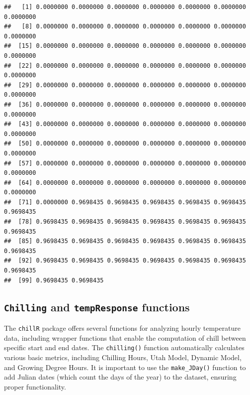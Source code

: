 \documentclass[
]{article}
\newenvironment{Shaded}{\begin{snugshade}}{\end{snugshade}}
\newcommand{\DecValTok}[1]{\textcolor[rgb]{0.00,0.00,0.81}{#1}}
\newcommand{\FunctionTok}[1]{\textcolor[rgb]{0.13,0.29,0.53}{\textbf{#1}}}
\newcommand{\NormalTok}[1]{#1}
\newcommand{\SpecialCharTok}[1]{\textcolor[rgb]{0.81,0.36,0.00}{\textbf{#1}}}
\begin{document}
\begin{Shaded}
\end{Shaded}

\begin{verbatim}
##   [1] 0.0000000 0.0000000 0.0000000 0.0000000 0.0000000 0.0000000 0.0000000
##   [8] 0.0000000 0.0000000 0.0000000 0.0000000 0.0000000 0.0000000 0.0000000
##  [15] 0.0000000 0.0000000 0.0000000 0.0000000 0.0000000 0.0000000 0.0000000
##  [22] 0.0000000 0.0000000 0.0000000 0.0000000 0.0000000 0.0000000 0.0000000
##  [29] 0.0000000 0.0000000 0.0000000 0.0000000 0.0000000 0.0000000 0.0000000
##  [36] 0.0000000 0.0000000 0.0000000 0.0000000 0.0000000 0.0000000 0.0000000
##  [43] 0.0000000 0.0000000 0.0000000 0.0000000 0.0000000 0.0000000 0.0000000
##  [50] 0.0000000 0.0000000 0.0000000 0.0000000 0.0000000 0.0000000 0.0000000
##  [57] 0.0000000 0.0000000 0.0000000 0.0000000 0.0000000 0.0000000 0.0000000
##  [64] 0.0000000 0.0000000 0.0000000 0.0000000 0.0000000 0.0000000 0.0000000
##  [71] 0.0000000 0.9698435 0.9698435 0.9698435 0.9698435 0.9698435 0.9698435
##  [78] 0.9698435 0.9698435 0.9698435 0.9698435 0.9698435 0.9698435 0.9698435
##  [85] 0.9698435 0.9698435 0.9698435 0.9698435 0.9698435 0.9698435 0.9698435
##  [92] 0.9698435 0.9698435 0.9698435 0.9698435 0.9698435 0.9698435 0.9698435
##  [99] 0.9698435 0.9698435
\end{verbatim}

\subsection{\texorpdfstring{\texttt{Chilling} and \texttt{tempResponse} functions}{Chilling and tempResponse functions}}\label{chilling-and-tempresponse-functions}

The \texttt{chillR} package offers several functions for analyzing hourly temperature data, including wrapper functions that enable the computation of chill between specific start and end dates. The \texttt{chilling()} function automatically calculates various basic metrics, including Chilling Hours, Utah Model, Dynamic Model, and Growing Degree Hours. It is important to use the \texttt{make\_JDay()} function to add Julian dates (which count the days of the year) to the dataset, ensuring proper functionality.
\end{document}
